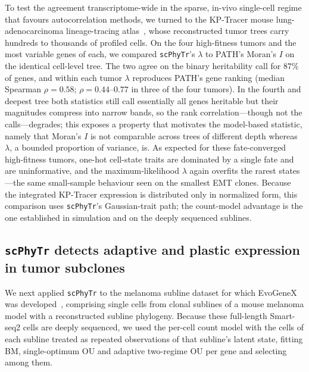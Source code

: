 \documentclass{article}
\newcommand{\scphytr}{\texttt{scPhyTr}}
\begin{document}
To test the agreement transcriptome-wide in the sparse, in-vivo single-cell regime that
favours autocorrelation methods, we turned to the KP-Tracer mouse lung-adenocarcinoma
lineage-tracing atlas~\cite{yang_kptracer_2022}, whose reconstructed tumor trees carry
hundreds to thousands of profiled cells. On the four high-fitness tumors and the most
variable genes of each, we compared \scphytr{}'s $\lambda$ to PATH's Moran's $I$ on the
identical cell-level tree. The two agree on the binary heritability call for $87\%$ of
genes, and within each tumor $\lambda$ reproduces PATH's gene ranking (median Spearman
$\rho = 0.58$; $\rho = 0.44$--$0.77$ in three of the four tumors). In the fourth and
deepest tree both statistics still call essentially all genes heritable but their
magnitudes compress into narrow bands, so the rank correlation---though not the
calls---degrades; this exposes a property that motivates the model-based statistic, namely
that Moran's $I$ is not comparable across trees of different depth whereas $\lambda$, a
bounded proportion of variance, is. As expected for these fate-converged high-fitness
tumors, one-hot cell-state traits are dominated by a single fate and are uninformative,
and the maximum-likelihood $\lambda$ again overfits the rarest states---the same
small-sample behaviour seen on the smallest EMT clones. Because the integrated KP-Tracer
expression is distributed only in normalized form, this comparison uses \scphytr{}'s
Gaussian-trait path; the count-model advantage is the one established in simulation and on
the deeply sequenced sublines.

\subsection*{\scphytr{} detects adaptive and plastic expression in tumor subclones}

We next applied \scphytr{} to the melanoma subline dataset for which EvoGeneX was
developed~\cite{hirsch_emt_2025}, comprising single cells from clonal sublines of a mouse
melanoma model with a reconstructed subline phylogeny. Because these full-length
Smart-seq2 cells are deeply sequenced, we used the per-cell count model with the cells of
each subline treated as repeated observations of that subline's latent state, fitting BM,
single-optimum OU and adaptive two-regime OU per gene and selecting among them.
\end{document}
